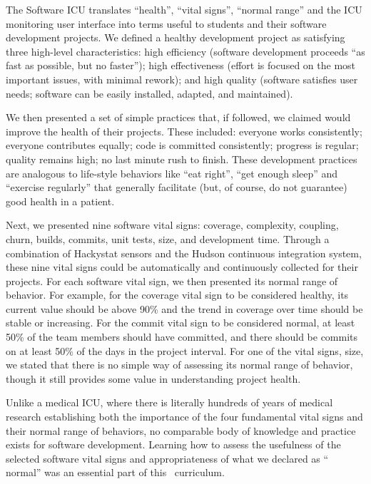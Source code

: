 The Software ICU translates ``health'', ``vital signs'', ``normal range''
and the ICU monitoring user interface into terms useful to students and
their software development projects.  We defined a healthy development
project as satisfying three high-level characteristics: high efficiency
(software development proceeds ``as fast as possible, but no faster'');
high effectiveness (effort is focused on the most important issues, with
minimal rework); and high quality (software satisfies user needs; software
can be easily installed, adapted, and maintained).

We then presented a set of simple practices that, if followed, we claimed
would improve the health of their projects.  These included: everyone works
consistently; everyone contributes equally; code is committed consistently;
progress is regular; quality remains high; no last minute rush to finish.
These development practices are analogous to life-style behaviors like
``eat right'', ``get enough sleep'' and ``exercise regularly'' that
generally facilitate (but, of course, do not guarantee) good health in a
patient.

Next, we presented nine software vital signs: coverage, complexity,
coupling, churn, builds, commits, unit tests, size, and development time. Through a
combination of Hackystat sensors and the Hudson continuous integration
system, these nine vital signs could be automatically and continuously
collected for their projects.  For each software vital sign, we then
presented its normal range of behavior.  For example, for the coverage
vital sign to be considered healthy, its current value should be above 90\%
and the trend in coverage over time should be stable or increasing.  For
the commit vital sign to be considered normal, at least 50\% of the team
members should have committed, and there should be commits on at least 50\%
of the days in the project interval.  For one of the vital signs, size, we
stated that there is no simple way of assessing its normal range of
behavior, though it still provides some value in understanding project
health.

Unlike a medical ICU, where there is literally hundreds of years of medical
research establishing both the importance of the four fundamental vital
signs and their normal range of behaviors, no comparable body of knowledge
and practice exists for software development.  Learning how to assess the
usefulness of the selected software vital signs and appropriateness of what
we declared as `` normal'' was an essential part of this \eCT\ curriculum.


